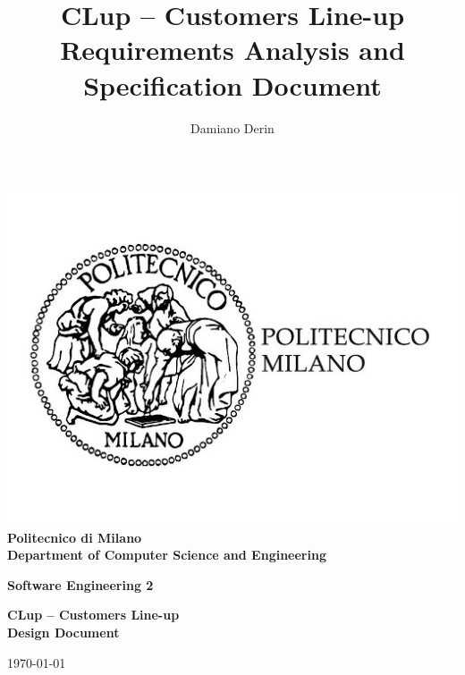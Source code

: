 \title{CLup – Customers Line-up \\ Requirements Analysis and Specification Document}
\author{Damiano Derin}

\begin{titlepage}
    \begin{center}
    \BgThispage
    \includegraphics[scale=0.3]{images/polimi_logo.jpg}\\
    {\LARGE {\bfseries Politecnico di Milano \\}}
    \vspace{.5cm}
    {\Large {\bfseries Department of Computer Science and Engineering \\}}
    \vspace{1.0cm}
    
    {\Large {\bfseries Software Engineering 2 \\}}
    \vspace{2.0cm}
    
    
    {\LARGE {\bfseries CLup – Customers Line-up \\
        Design Document\\}}
    \vspace{1cm}

    {\large \today \\
    }



\end{center}
\end{titlepage}

